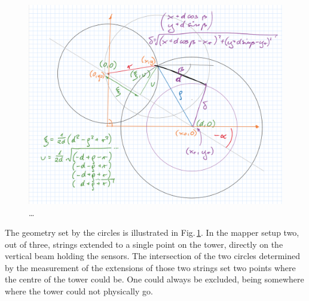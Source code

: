 \begin{figure}
  \centering
  \includegraphics[width=0.9\linewidth]{gfx/mapping/geometry.png}
  \caption{\ldots}\label{fig:mapping_geometry}
\end{figure}

The geometry set by the circles is illustrated in Fig.\,\ref{fig:mapping_geometry}. In the mapper setup two, out of three, strings extended to a single point on the tower, directly on the vertical beam holding the sensors. The intersection of the two circles determined by the measurement of the extensions of those two strings set two points where the centre of the tower could be. One could always be excluded, being somewhere where the tower could not physically go.

